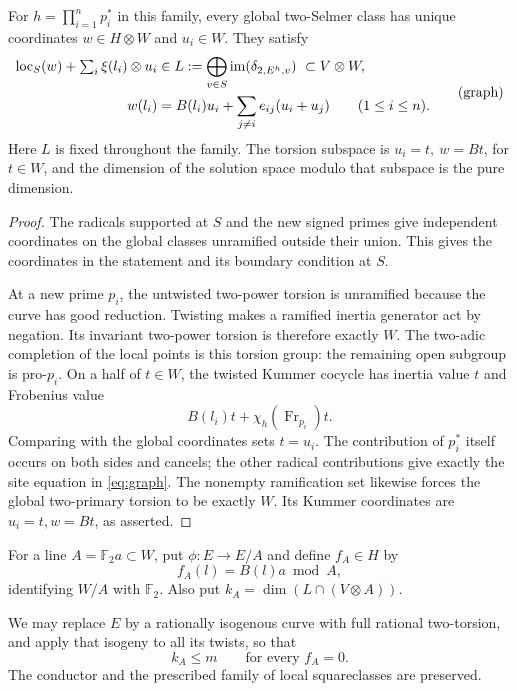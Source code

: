 \begin{lemma}\label{lem:reducible-graph}
For \(h=\prod_{i=1}^n p_i^*\) in this family, every global two-Selmer class
has unique coordinates \(w\in H\otimes W\) and \(u_i\in W\).  They satisfy
\[
\begin{split}
 {\rm loc}_S(w)+\textstyle\sum_i \xi(l_i)\otimes u_i
 &\in L:=\bigoplus_{v\in S}\operatorname{im}(\delta_{2,E^h,v})
                     \ \subset V\otimes W,\\
 w(l_i)&=B(l_i)u_i+\sum_{j\ne i}e_{ij}(u_i+u_j)
                      \qquad(1\le i\le n).
\end{split}\tag{graph}\label{eq:graph}
\]
Here \(L\) is fixed throughout the family.  The torsion subspace is
\(u_i=t,\ w=Bt\), for \(t\in W\), and the dimension of the solution space
modulo that subspace is the pure dimension.
\end{lemma}

\begin{proof}
The radicals supported at \(S\) and the new signed primes give independent
coordinates on the global classes unramified outside their union.  This
gives the coordinates in the statement and its boundary condition at
\(S\).

At a new prime \(p_i\), the untwisted two-power torsion is unramified
because the curve has good reduction.  Twisting makes a ramified inertia
generator act by negation.  Its invariant two-power torsion is therefore
exactly \(W\).  The two-adic completion of the local points is this
torsion group: the remaining open subgroup is pro-\(p_i\).  On a half of
\(t\in W\), the twisted Kummer cocycle has inertia value \(t\) and
Frobenius value
\[
 B(l_i)t+\chi_h(\operatorname{Fr}_{p_i})t.
\]
Comparing with the global coordinates sets \(t=u_i\).  The contribution
of \(p_i^*\) itself occurs on both sides and cancels; the other radical
contributions give exactly the site equation in \eqref{eq:graph}.
The nonempty ramification set likewise forces the global two-primary
torsion to be exactly \(W\).  Its Kummer coordinates are
\(u_i=t,w=Bt\), as asserted.
\end{proof}

For a line \(A=\mathbb F_2a\subset W\), put \(\phi:E\to E/A\) and define
\(f_A\in H\) by
\[
 f_A(l)=B(l)a\bmod A,
\]
identifying \(W/A\) with \(\mathbb F_2\).  Also put
\(k_A=\dim(L\cap(V\otimes A))\).

\begin{lemma}\label{lem:reducible-orientation}
We may replace \(E\) by a rationally isogenous curve with full rational
two-torsion, and apply that isogeny to all its twists, so that
\[
                    k_A\le m\qquad\text{for every }f_A=0.
                    \tag{orient}\label{eq:orient}
\]
The conductor and the prescribed family of local squareclasses are
preserved.
\end{lemma}

